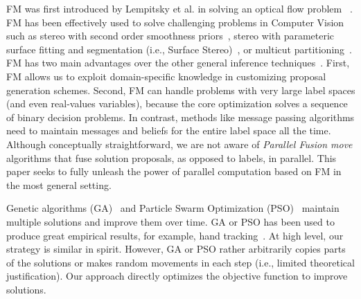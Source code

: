 
\noindent FM was first introduced by Lempitsky et al. in solving an
optical flow problem~\cite{first_fusion_viktor} . FM has been effectively used to solve challenging
problems in Computer Vision such as stereo with second order smoothness
priors~\cite{woodford}, stereo with parameteric surface fitting and
segmentation (i.e., Surface Stereo)~\cite{surface_stereo}, or multicut
partitioning~\cite{fusionmovesforcorrelationclustering}.
%
FM has two main advantages over the other general inference
techniques~\cite{trw,loopy_belief_propagation}. First, FM allows us to
exploit domain-specific knowledge in customizing proposal generation
schemes. Second, FM can handle problems with very large label spaces
(and even real-values variables), because the core optimization
solves a sequence of binary decision problems.
%
In contrast, methods like message passing algorithms need to maintain
messages and beliefs for the entire label space all the time.
%
Although conceptually straightforward, we are not aware of {\it Parallel
Fusion move} algorithms that fuse solution proposals, as opposed to
labels, in parallel. This paper seeks to fully unleash the power of
parallel computation based on FM in the most general setting.



\noindent
Genetic algorithms (GA)~\cite{ga} and Particle Swarm
Optimization (PSO)~\cite{pso} maintain multiple solutions and improve
them over time.
%
GA or PSO has been used to produce great empirical results, for example,
hand tracking~\cite{pushmeet_hand_tracking}.
%
At high level, our strategy is similar in spirit. However, GA or PSO
rather arbitrarily copies parts of the solutions or makes random movements
in each step (i.e., limited theoretical justification).
%
Our approach directly optimizes the objective function to improve
solutions.


